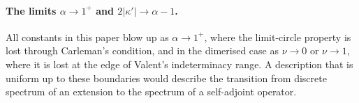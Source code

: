 \paragraph{The limits $\alpha\to1^+$ and $2|\kappa'|\to\alpha-1$.} All constants in this paper blow up as
$\alpha\to1^+$, where the limit-circle property is lost through Carleman's condition, and in
the dimerised case as $\nu\to0$ or $\nu\to1$, where it is lost at the edge of Valent's
indeterminacy range. A description that is uniform up to these boundaries would describe
the transition from discrete spectrum of an extension to the spectrum of a self-adjoint
operator.
